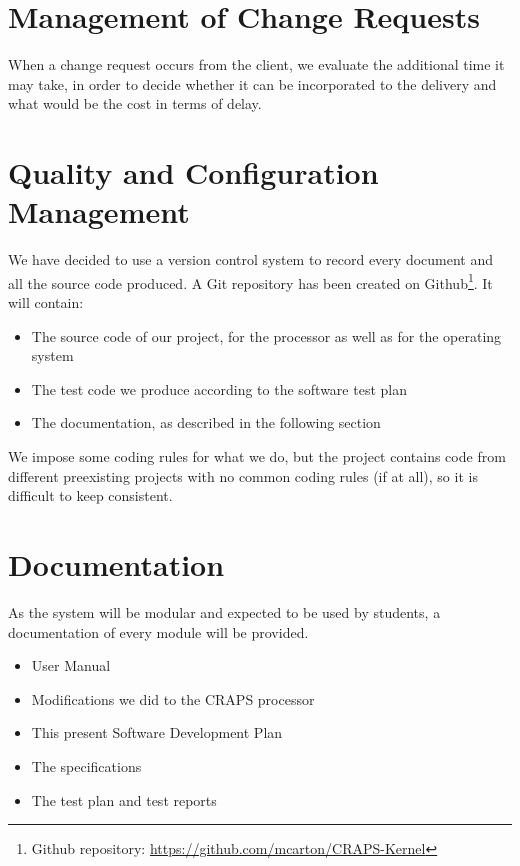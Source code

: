 \documentclass{article}
\begin{document}
  \section{Management of Change Requests}
    When a change request occurs from the client, we evaluate the additional
    time it may take, in order to decide whether it can be incorporated to the
    delivery and what would be the cost in terms of delay.

  \section{Quality and Configuration Management}
    We have decided to use a version control system to record every document and
    all the source code produced. A Git repository has been created on
    Github\footnote{Github repository:
    \url{https://github.com/mcarton/CRAPS-Kernel}}.
    It will contain:
    \begin{itemize}
      \item The source code of our project, for the processor as well as for the
            operating system
      \item The test code we produce according to the software test plan
      \item The documentation, as described in the following section
    \end{itemize}

    We impose some coding rules for what we do, but the project contains code
    from different preexisting projects with no common coding rules (if at all),
    so it is difficult to keep consistent.

  \section{Documentation}
    As the system will be modular and expected to be used by students, a
    documentation of every module will be provided.

    \begin{itemize}
      \item User Manual
      \item Modifications we did to the CRAPS processor
      \item This present Software Development Plan
      \item The specifications
      \item The test plan and test reports
    \end{itemize}
\end{document}
